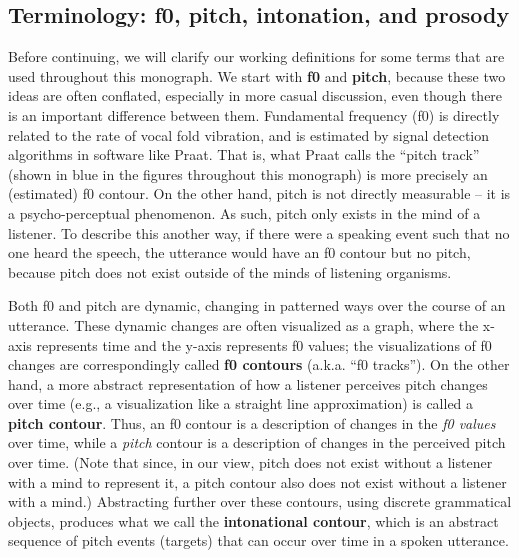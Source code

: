 \subsection{Terminology: f0, pitch, intonation, and prosody}\label{sec:terminology}

Before continuing, we will clarify our working definitions for some terms that are used throughout this monograph. We start with \textbf{f0} and \textbf{pitch}, because these two ideas are often conflated, especially in more casual discussion, even though there is an important difference between them. Fundamental frequency (f0) is directly related to the rate of vocal fold vibration, and is estimated by signal detection algorithms in software like Praat. That is, what Praat calls the “pitch track” (shown in blue in the figures throughout this monograph) is more precisely an (estimated) f0 contour. On the other hand, pitch is not directly measurable – it is a psycho-perceptual phenomenon. As such, pitch only exists in the mind of a listener. To describe this another way, if there were a speaking event such that no one heard the speech, the utterance would have an f0 contour but no pitch, because pitch does not exist outside of the minds of listening organisms.

Both f0 and pitch are dynamic, changing in patterned ways over the course of an utterance. These dynamic changes are often visualized as a graph, where the x-axis represents time and the y-axis represents f0 values; the visualizations of f0 changes are correspondingly called \textbf{f0 contours} (a.k.a. “f0 tracks”). On the other hand, a more abstract representation of how a listener perceives pitch changes over time (e.g., a visualization like a straight line approximation) is called a \textbf{pitch contour}. Thus, an f0 contour is a description of changes in the \emph{f0 values} over time, while a \emph{pitch} contour is a description of changes in the perceived pitch over time. (Note that since, in our view, pitch does not exist without a listener with a mind to represent it, a pitch contour also does not exist without a listener with a mind.) Abstracting further over these contours, using discrete grammatical objects, produces what we call the \textbf{intonational contour}, which is an abstract sequence of pitch events (targets) that can occur over time in a spoken utterance.

